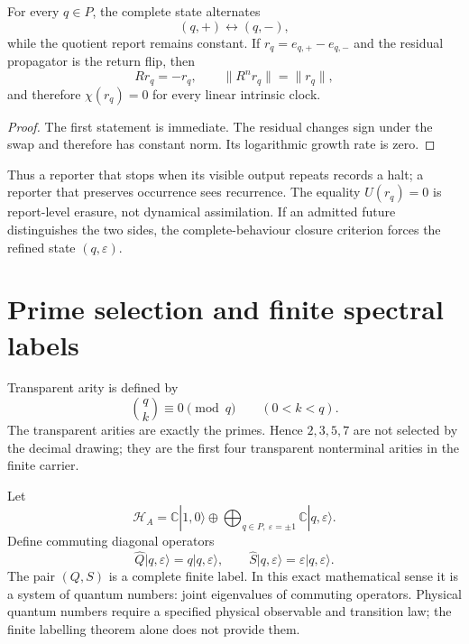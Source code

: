 \documentclass[11pt,a4paper]{article}
\begin{document}
\begin{theorem}
For every $q\in P$, the complete state alternates
\begin{equation}
(q,+)\leftrightarrow(q,-),
\end{equation}
while the quotient report remains constant. If $r_q=e_{q,+}-e_{q,-}$ and the residual propagator is the return flip, then
\begin{equation}
Rr_q=-r_q,\qquad \|R^nr_q\|=\|r_q\|,
\end{equation}
and therefore $\chi(r_q)=0$ for every linear intrinsic clock.
\end{theorem}
\begin{proof}
The first statement is immediate. The residual changes sign under the swap and therefore has constant norm. Its logarithmic growth rate is zero.
\end{proof}

Thus a reporter that stops when its visible output repeats records a halt; a reporter that preserves occurrence sees recurrence. The equality $U(r_q)=0$ is report-level erasure, not dynamical assimilation. If an admitted future distinguishes the two sides, the complete-behaviour closure criterion forces the refined state $(q,\varepsilon)$.

\section{Prime selection and finite spectral labels}
Transparent arity is defined by
\begin{equation}
\binom qk\equiv0\pmod q\qquad(0<k<q).
\end{equation}
The transparent arities are exactly the primes. Hence $2,3,5,7$ are not selected by the decimal drawing; they are the first four transparent nonterminal arities in the finite carrier.

Let
\begin{equation}
\mathcal H_A=\mathbb C|1,0\rangle\oplus\bigoplus_{q\in P,\ \varepsilon=\pm1}\mathbb C|q,\varepsilon\rangle.
\end{equation}
Define commuting diagonal operators
\begin{equation}
\widehat Q|q,\varepsilon\rangle=q|q,\varepsilon\rangle,
\qquad
\widehat S|q,\varepsilon\rangle=\varepsilon|q,\varepsilon\rangle.
\end{equation}
The pair $(Q,S)$ is a complete finite label. In this exact mathematical sense it is a system of quantum numbers: joint eigenvalues of commuting operators. Physical quantum numbers require a specified physical observable and transition law; the finite labelling theorem alone does not provide them.
\end{document}
